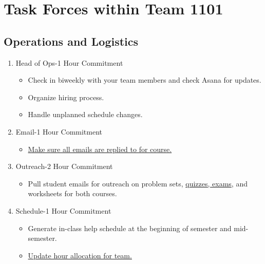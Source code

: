 \documentclass[a4paper]{article}
\begin{document}
\section{Task Forces within Team 1101}
\subsection{Operations and Logistics} 
\begin{enumerate}
\item Head of Ops-1 Hour Commitment
\begin{itemize}
\item Check in biweekly with your team members and check Asana for updates. 
\item Organize hiring process. 
\item Handle unplanned schedule changes. 
\end{itemize}
\item Email-1 Hour Commitment
\begin{itemize}
\item \hyperref[team_email]{Make sure all emails are replied to for course.}
\end{itemize}
\item Outreach-2 Hour Commitment
\begin{itemize}
\item Pull student emails for outreach on problem sets, \hyperref[quiz_outreach]{quizzes, exams}, and worksheets for both courses.
\end{itemize}
\item Schedule-1 Hour Commitment 
\begin{itemize}
\item Generate in-class help schedule at the beginning of semester and mid-semester. 
\item\hyperref[hour_allocation]{Update hour allocation for team.}
\end{itemize}
\end{enumerate}
\end{document}
